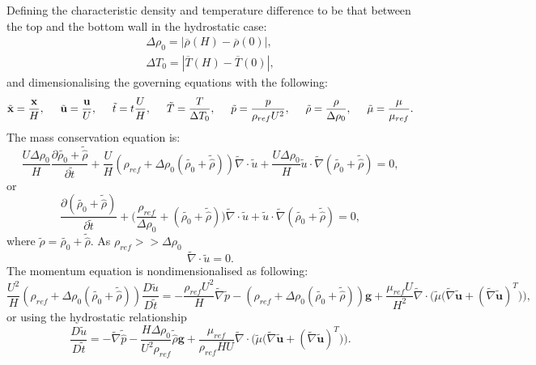 \documentclass[preprint,12pt]{article}
\begin{document}
Defining the characteristic density and temperature difference to be that between the top and the bottom wall in the hydrostatic case:
 \begin{subequations}\begin{align}
\Delta \rho_0=|\overline{\rho}(H)-\overline{\rho}(0)|,\\
\Delta T_0=|\overline{T}(H)-\overline{T}(0)|,
 	\end{align}\end{subequations}
 and dimensionalising the governing equations with the following:
 \begin{equation}
 \tilde{\mathbf{x}}=\frac{\mathbf{x}}{H},\hspace{.2in} \tilde{\mathbf{u}}=\frac{\mathbf{u}}{U}, \hspace{.2in} \tilde{t}=t\frac{U}{H},\hspace{.2in} \tilde{T}=\frac{T}{{\Delta T_0}},\hspace{.2in}\tilde{p}=\frac{p}{\rho_{ref} U^2},\hspace{.2in}\tilde{\rho}=\frac{\rho}{\Delta\rho_0},\hspace{.2in}\tilde{\mu}=\frac{\mu}{\mu_{ref}}.
 \end{equation}
 The mass conservation equation is:
 \begin{equation}
\frac{U\Delta \rho_0}{H}\frac{\partial {\tilde{\rho_0}+\tilde{\hat{\rho}} }}{\partial \tilde{t}}+\frac{U}{H}(\rho_{ref}+\Delta \rho_0 (\tilde{\rho_0}+\tilde{\hat{\rho}}))\tilde{\nabla}\cdot\tilde{u}+ \frac{U\Delta \rho_0}{H}\tilde{u}\cdot\tilde{\nabla}(\tilde{\rho_0}+\tilde{\hat{\rho}})=0,
 \end{equation}
 or
 \begin{equation}
 \frac{\partial (\tilde{\rho_0}+\tilde{\hat{\rho}})}{\partial \tilde{t}}+\Big(\frac{\rho_{ref}}{\Delta \rho_0}+(\tilde{\rho_0}+\tilde{\hat{\rho}})\Big)\tilde{\nabla}\cdot\tilde{u}+ \tilde{u}\cdot\tilde{\nabla}(\tilde{\rho_0}+\tilde{\hat{\rho}})=0,
 \end{equation}
 where $\tilde{\rho}=\tilde{\rho_0}+\tilde{\hat{\rho}}$. As $\rho_{ref}>> \Delta \rho_0$
 \begin{equation}
\tilde{\nabla}\cdot\tilde{u}=0.
 \end{equation}
 The momentum equation is non\textendash dimensionalised as following:
 \begin{equation}
   \frac{U^2}{H}(\rho_{ref}+\Delta \rho_0 (\tilde{\rho_0}+\tilde{\hat{\rho}}))\frac{D \tilde{u}}{D \tilde{t}}=-\frac{\rho_{ref}U^2}{H}\tilde{\nabla}\tilde{p}-(\rho_{ref}+\Delta \rho_0 (\tilde{\rho_0}+\tilde{\hat{\rho}}))\mathbf{g}+\frac{\mu_{ref}U}{H^2}\tilde{\nabla}\cdot\Big({\tilde{\mu}}\big({\tilde{\nabla}} \mathbf{\tilde{u}}+(\tilde{\nabla} \mathbf{\tilde{u}})^T\big)\Big),
 \end{equation}
 or using the hydrostatic relationship
 \begin{equation}
 \frac{D \tilde{u}}{D \tilde{t}}=-\tilde{\nabla}\tilde{\hat{p}}-\frac{H\Delta \rho_0}{U^2\rho_{ref}} \tilde{\hat{\rho}}\mathbf{g}+\frac{\mu_{ref}}{\rho_{ref}HU}\tilde{\nabla}\cdot\Big({\tilde{\mu}}\big({\tilde{\nabla}} \mathbf{\tilde{u}}+(\tilde{\nabla} \mathbf{\tilde{u}})^T\big)\Big).
 \end{equation}
 
\end{document}
